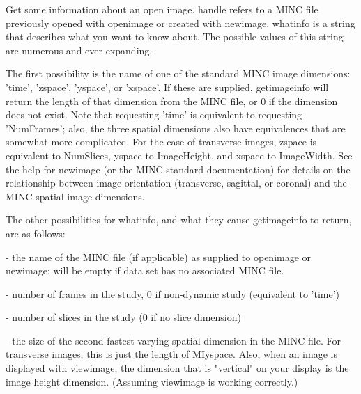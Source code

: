   Get some information about an open image.  handle refers to a MINC
  file previously opened with openimage or created with newimage.
  whatinfo is a string that describes what you want to know about.
  The possible values of this string are numerous and ever-expanding.
  
  The first possibility is the name of one of the standard MINC image
  dimensions: 'time', 'zspace', 'yspace', or 'xspace'.  If these are
  supplied, getimageinfo will return the length of that dimension from
  the MINC file, or 0 if the dimension does not exist.  Note that
  requesting 'time' is equivalent to requesting 'NumFrames'; also,
  the three spatial dimensions also have equivalences that are
  somewhat more complicated.  For the case of transverse images,
  zspace is equivalent to NumSlices, yspace to ImageHeight, and xspace
  to ImageWidth.  See the help for newimage (or the MINC standard
  documentation) for details on the relationship between image
  orientation (transverse, sagittal, or coronal) and the MINC spatial
  image dimensions.
  
  The other possibilities for whatinfo, and what they cause
  getimageinfo to return, are as follows:
 
\begin{description}
\item {}     - the name of the MINC file (if applicable)
                     as supplied to openimage or newimage; will be
                     empty if data set has no associated MINC file.
\end{description}
 
\begin{description}
\item {}    - number of frames in the study, 0 if non-dynamic
                     study (equivalent to 'time')
\end{description}
 
\begin{description}
\item {}    - number of slices in the study (0 if no slice
                     dimension)
\end{description}
 
\begin{description}
\item {}  - the size of the second-fastest varying spatial 
                     dimension in the MINC file.  For transverse
                     images, this is just the length of MIyspace.
                     Also, when an image is displayed with viewimage,
                     the dimension that is "vertical" on your display
                     is the image height dimension.  (Assuming
                     viewimage is working correctly.)
\end{description}
 
